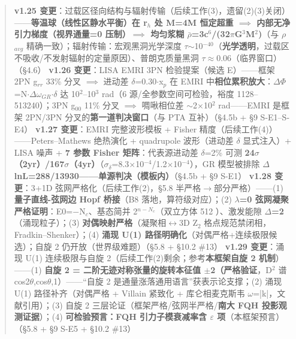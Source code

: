 \documentclass[UTF8,fontset=windows]{csoarticle}
\newcommand{\up}[1]{\ensuremath{^{#1}}}
\newcommand{\down}[1]{\ensuremath{_{#1}}}
\begin{document}
\begin{quote}
\textbf{v1.25 变更}：过载区径向结构与辐射传输（后续工作(3)，遗留(2)(3)关闭）------\textbf{等温球（线性区静水平衡）在 r\down{h} 处 M=4M 恒定超重 \ensuremath{\implies} 内部无净引力梯度（视界通量=0 压制）\ensuremath{\implies} 均匀浆糊 \ensuremath{\bar{\rho}}=3c\up{6}/(32\ensuremath{\pi}G\up{3}M\up{2})}（与 \ensuremath{\rho}\down{avg} 精确一致）；辐射传输：宏观黑洞光学深度 \ensuremath{\tau}\ensuremath{\sim}10\up{-40}（\textbf{光学透明}，过载区不吸收/不发射辐射的定量原因）、普朗克质量黑洞 \ensuremath{\tau}\ensuremath{\approx}0.06（临界窗口）（\S{}4.6）
\textbf{v1.26 变更}：LISA EMRI 3PN 检验提案（候选 E）------框架 2PN g\down{rr} 33\% 分叉 \ensuremath{\implies} 进动差 \ensuremath{\delta}=0.30\ensuremath{\cdot}x\down{p} 在 EMRI 中\textbf{相位累积放大}：\ensuremath{\Delta}\ensuremath{\Phi}=N\ensuremath{\cdot}\ensuremath{\Delta}\ensuremath{\omega}\down{GR}\ensuremath{\cdot}\ensuremath{\delta} 达 10\up{2}--10\up{3} rad（6 源/全参数空间可检验，裕度 1128--513240）；3PN g\down{00} 11\% 分叉 \ensuremath{\implies} 啁啾相位差 \ensuremath{\sim}2\ensuremath{\times}10\up{2} rad------EMRI 是框架 2PN/3PN 分叉的\textbf{第一道判决窗口}（与 PTA 互补）（\S{}4.5b + \S{}9 S-E1--S-E4）
\textbf{v1.27 变更}：EMRI 完整波形模板 + Fisher 精度（后续工作(4)）------Peters--Mathews 绝热演化 + quadrupole 波形（进动差 \ensuremath{\delta} 显式注入）+ LISA 噪声 + \textbf{7 参数 Fisher 矩阵}：代表源进动差 \ensuremath{\delta}=2\% 可测 \textbf{24\ensuremath{\sigma}（2yr）/167\ensuremath{\sigma}（4yr）}（\ensuremath{\sigma}\down{\delta{}}=8.3\ensuremath{\times}10\up{-4}/1.2\ensuremath{\times}10\up{-4}），GR 模型被排除 \textbf{\ensuremath{\Delta}lnL=288/13930------单源判决（模板内）}（\S{}4.5b + \S{}9 S-E1）
\textbf{v1.28 变更}：3+1D 弦网严格化（后续工作(2)，\S{}5.8 半严格\ensuremath{\to}部分严格）------(1) \textbf{量子直线-弦网边 Hopf 桥接}（B8 落地，算符级对应）；(2) \textbf{\ensuremath{\lambda}=0 弦网凝聚严格证明}：E0=\ensuremath{-}N\down{c}、基态简并 2\up{n-N\down{c}}（双立方体 512 \checkmark）、激发能隙 \textbf{\ensuremath{\Delta}=2}（涌现粒子）；(3) \textbf{对偶映射严格}（凝聚相\ensuremath{\leftrightarrow}3D Z\down{2} 格点规范禁闭相，Fradkin--Shenker）；(4) \textbf{涌现 U(1) 路径明确化}（对偶严格+连续极限候选）；自旋 2 仍开放（世界级难题）（\S{}5.8 + \S{}10.2 \#13）
\textbf{v1.29 变更}：涌现 U(1) 连续极限与自旋 2（后续工作(2)剩余；参考\textbf{本框架自旋 2 机制}）------(1) \textbf{自旋 2 = 二阶无迹对称张量的旋转本征值 \ensuremath{\pm}2（严格验证}，D\up{2} 谱 {cos2\ensuremath{\theta},cos\ensuremath{\theta},1}）------“自旋 2 是通量涨落通用语言”获表示论支撑；(2) 涌现 U(1) 路径补齐（对偶严格 + Villain 紧致化 + 库仑相麦克斯韦 \ensuremath{\omega}=|k|，文献引用）；(3) 自旋 2 三层论证（框架严格/弦网半严格/\textbf{南大 FQH 投影观测证据}）；(4) \textbf{可检验预言：FQH 引力子模衰减率含 \ensuremath{\varepsilon} 项}（本框架预言）（\S{}5.8 + \S{}9 S-E5 + \S{}10.2 \#13）

\end{quote}
\end{document}
